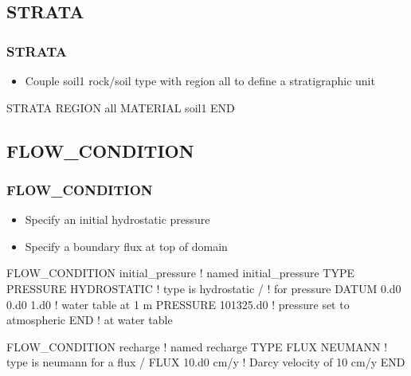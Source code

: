 \documentclass{beamer}
\newcommand\redcomment[1]{{{\color{red} #1}}}
\newcommand\bluecomment[1]{{{\color{blue} #1}}}
\newcommand\greencomment[1]{{{\color{green} #1}}}
\begin{document}
\subsection{STRATA}

\begin{frame}[fragile]\frametitle{STRATA}

\begin{itemize}
\item Couple \greencomment{soil1} rock/soil type with region \greencomment{all} to define a stratigraphic unit
\end{itemize}

\begin{semiverbatim}

STRATA
  REGION all
  MATERIAL soil1
END


\end{semiverbatim}

\end{frame}

\subsection{FLOW\_CONDITION}

\begin{frame}[fragile]\frametitle{FLOW\_CONDITION}

\begin{itemize}
\item Specify an initial hydrostatic pressure
\item Specify a boundary flux at top of domain
\end{itemize}

\begin{semiverbatim}
FLOW_CONDITION initial_pressure \bluecomment{! named \greencomment{initial_pressure}}
  TYPE
    PRESSURE HYDROSTATIC \bluecomment{! type is \redcomment{hydrostatic}}
  /                      \bluecomment{!   for pressure}
  DATUM 0.d0 0.d0 1.d0   \bluecomment{! water table at 1 m}
  PRESSURE 101325.d0     \bluecomment{! pressure set to atmospheric}
END                      \bluecomment{!   at water table}

FLOW_CONDITION recharge  \bluecomment{! named \greencomment{recharge}}
  TYPE
    FLUX NEUMANN         \bluecomment{! type is \redcomment{neumann} for a flux}
  /
  FLUX 10.d0 cm/y        \bluecomment{! Darcy velocity of 10 cm/y}
END
\end{semiverbatim}

\end{frame}
\end{document}
